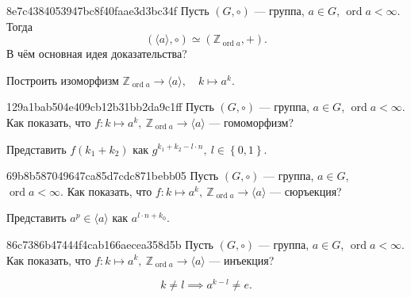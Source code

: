 \begin{note}{8e7c4384053947bc8f40faae3d3bc34f}
    Пусть \({ (G, \circ)}\) --- группа, \({ a \in G }\), \({ \operatorname{ord} a < \infty }\).
    Тогда
    \[
        (\langle a \rangle, \circ) \simeq (\mathbb Z_{\operatorname{ord} a}, +).
    \]
    В чём основная идея доказательства?

    \begin{cloze}{1}
        Построить изоморфизм \({ \mathbb Z_{\operatorname{ord} a} \to \langle a \rangle, \quad k \mapsto a^{k} }\).
    \end{cloze}
\end{note}

\begin{note}{129a1bab504e409cb12b31bb2da9c1ff}
    Пусть \({ (G, \circ)}\) --- группа, \({ a \in G }\), \({ \operatorname{ord} a < \infty }\).
    Как показать, что \({ f : k \mapsto a^{k},\: \mathbb Z_{\operatorname{ord} a} \to \langle a \rangle }\) --- гомоморфизм?

    \begin{cloze}{1}
        Представить \({ f(k_1 + k_2) }\) как \({ g^{k_1 + k_2 - l \cdot n},\: l \in \left\{ 0, 1 \right\} }\).
    \end{cloze}
\end{note}

\begin{note}{69b8b587049647ca85d7cdc871bebb05}
    Пусть \({ (G, \circ)}\) --- группа, \({ a \in G }\), \({ \operatorname{ord} a < \infty }\).
    Как показать, что \({ f : k \mapsto a^{k},\: \mathbb Z_{\operatorname{ord} a} \to \langle a \rangle }\) --- сюръекция?

    \begin{cloze}{1}
        Представить \({ a^{p} \in \langle a \rangle }\) как \({ a^{l \cdot n + k_0} }\).
    \end{cloze}
\end{note}

\begin{note}{86c7386b47444f4cab166aecea358d5b}
    Пусть \({ (G, \circ)}\) --- группа, \({ a \in G }\), \({ \operatorname{ord} a < \infty }\).
    Как показать, что \({ f : k \mapsto a^{k},\: \mathbb Z_{\operatorname{ord} a} \to \langle a \rangle }\) --- инъекция?

    \begin{cloze}{1}
        \[
            k \neq l \implies a^{k - l} \neq e.
        \]
    \end{cloze}
\end{note}

